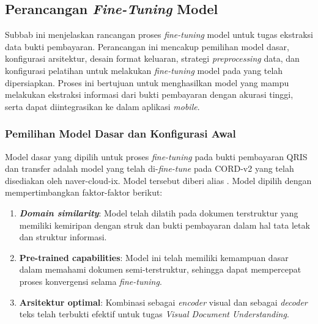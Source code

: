 \subsection{Perancangan \emph{Fine-Tuning} Model \donut}
\label{subsec:perancangan-fine-tuning-model}

Subbab ini menjelaskan rancangan proses \emph{fine-tuning} model \donut{} untuk tugas ekstraksi data bukti pembayaran. Perancangan ini mencakup pemilihan model dasar, konfigurasi arsitektur, desain format keluaran, strategi \emph{preprocessing} data, dan konfigurasi pelatihan untuk melakukan \emph{fine-tuning} model \donut{} pada \dataset{} yang telah dipersiapkan. Proses ini bertujuan untuk menghasilkan model yang mampu melakukan ekstraksi informasi dari bukti pembayaran dengan akurasi tinggi, serta dapat diintegrasikan ke dalam aplikasi \emph{mobile}.

\subsubsection{Pemilihan Model Dasar dan Konfigurasi Awal}
\label{subsubsec:pemilihan-model-dasar}

Model dasar yang dipilih untuk proses \emph{fine-tuning} pada \dataset{} bukti pembayaran QRIS dan transfer adalah model \donut{} yang telah di-\emph{fine-tune} pada \dataset{} CORD-v2 yang telah disediakan oleh naver-cloud-ix. Model tersebut diberi alias \donutcord. Model \donutcord{} dipilih dengan mempertimbangkan faktor-faktor berikut:

\begin{enumerate}
    \item \textbf{\emph{Domain similarity}}: Model \donutcord telah dilatih pada \dataset{} dokumen terstruktur yang memiliki kemiripan dengan struk dan bukti pembayaran dalam hal tata letak dan struktur informasi.
    \item \textbf{Pre-trained capabilities}: Model ini telah memiliki kemampuan dasar dalam memahami dokumen semi-terstruktur, sehingga dapat mempercepat proses konvergensi selama \emph{fine-tuning}.
    \item \textbf{Arsitektur optimal}: Kombinasi \swin{} \transformer{} sebagai \emph{encoder} visual dan \bart{} sebagai \emph{decoder} teks telah terbukti efektif untuk tugas \emph{Visual Document Understanding}.
\end{enumerate}

